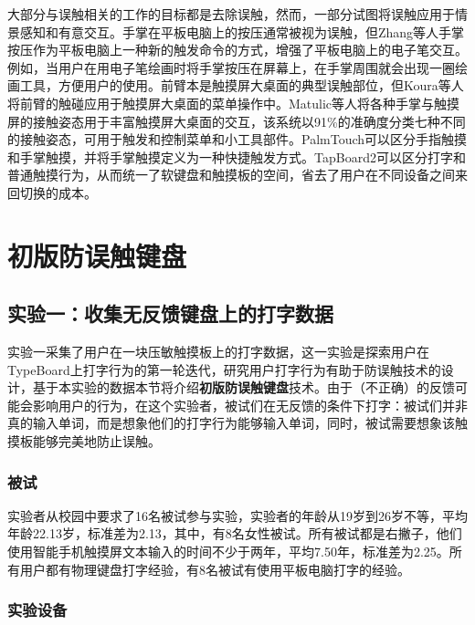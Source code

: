 大部分与误触相关的工作的目标都是去除误触，然而，一部分试图将误触应用于情景感知\cite{2019-PenTouch}和有意交互\cite{2017-HandContact, 2018-PalmTouch, 2016-TapBoard2}。手掌在平板电脑上的按压通常被视为误触，但Zhang等人手掌按压作为平板电脑上一种新的触发命令的方式\cite{2019-PenTouch}，增强了平板电脑上的电子笔交互。例如，当用户在用电子笔绘画时将手掌按压在屏幕上，在手掌周围就会出现一圈绘画工具，方便用户的使用。前臂本是触摸屏大桌面的典型误触部位，但Koura等人将前臂的触碰应用于触摸屏大桌面的菜单操作中\cite{2012-Amazing}。Matulic等人将各种手掌与触摸屏的接触姿态用于丰富触摸屏大桌面的交互，该系统以91\%的准确度分类七种不同的接触姿态，可用于触发和控制菜单和小工具部件。PalmTouch可以区分手指触摸和手掌触摸，并将手掌触摸定义为一种快捷触发方式\cite{2018-PalmTouch}。TapBoard2可以区分打字和普通触摸行为\cite{2006-TouchType}，从而统一了软键盘和触摸板的空间，省去了用户在不同设备之间来回切换的成本。

\section{初版防误触键盘}

\subsection{实验一：收集无反馈键盘上的打字数据}

实验一采集了用户在一块压敏触摸板上的打字数据，这一实验是探索用户在TypeBoard上打字行为的第一轮迭代，研究用户打字行为有助于防误触技术的设计，基于本实验的数据本节将介绍\textbf{初版防误触键盘}技术。由于（不正确）的反馈可能会影响用户的行为，在这个实验者，被试们在无反馈的条件下打字：被试们并非真的输入单词，而是想象他们的打字行为能够输入单词，同时，被试需要想象该触摸板能够完美地防止误触。

\subsubsection{被试}

实验者从校园中要求了16名被试参与实验，实验者的年龄从19岁到26岁不等，平均年龄22.13岁，标准差为2.13，其中，有8名女性被试。所有被试都是右撇子，他们使用智能手机触摸屏文本输入的时间不少于两年，平均7.50年，标准差为2.25。所有用户都有物理键盘打字经验，有8名被试有使用平板电脑打字的经验。

\subsubsection{实验设备}

